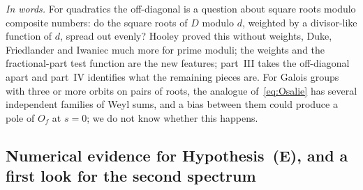 \documentclass[11pt,a4paper]{article}
\theoremstyle{remark}\newtheorem{remark}[theorem]{Remark}
\begin{document}
\emph{In words.} For quadratics the off-diagonal is a question about square roots modulo composite numbers:
do the square roots of $D$ modulo $d$, weighted by a divisor-like function of $d$, spread out evenly? Hooley
proved this without weights, Duke, Friedlander and Iwaniec much more for prime moduli; the weights and the
fractional-part test function are the new features; part~III takes the off-diagonal apart and part~IV identifies
what the remaining pieces are. For Galois
groups with three or more orbits on pairs of roots, the analogue of~\eqref{eq:Osalie} has several independent
families of Weyl sums, and a bias between them could produce a pole of $O_f$ at $s=0$; we do not know
whether this happens.

\subsection{Numerical evidence for Hypothesis~(E), and a first look for the second spectrum}\label{sec:offnum}
\end{document}
